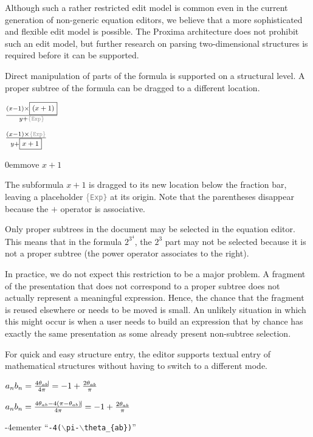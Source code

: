 \documentclass{speauth}
\begin{document}
Although such a rather restricted edit model is common even in the current generation of non-generic equation editors, we believe that a more sophisticated and flexible edit model is possible. The Proxima architecture does not prohibit such an edit model, but further research on parsing two-dimensional structures is required before it can be supported.


Direct manipulation of parts of the formula is supported on a structural level. A proper subtree of the formula can be dragged to a different location.

\editStepScrshot
{$ \frac{(x-1)\times{ \framebox{\scriptsize $(x+1)$}}}{y + \textcolor{gray}{\{\tt Exp\}}}    $}
{\begin{normalsize}$ \frac{(x-1)\times{\textcolor{gray}{\{\tt Exp\}}} }{y + \framebox{\scriptsize $x+1$}}{\vrule height1.8ex width-2.5pt depth1.99ex} $ \end{normalsize}}
{0em}{\small move $x+1$}

The subformula $x+1$ is dragged to its new location below the fraction bar, leaving a placeholder \textcolor{gray}{\{\tt Exp\}} at its origin. Note that the parentheses disappear because the $+$ operator is associative. 

Only proper subtrees in the document may be selected in the equation editor. This means that in the formula $2^{3^4}$, 
the $2^3$ part may not be selected because it is not a proper subtree (the power operator associates to the right). 

In practice, we do not expect this restriction to be a major problem. A fragment of the presentation that does not correspond to a proper subtree does not actually represent a meaningful expression. Hence, the chance that the fragment is reused elsewhere or needs to be moved is small. An unlikely situation in which this might occur is when a user needs to build an expression that by chance has exactly the same presentation as some already present non-subtree selection.


For quick and easy structure entry, the editor supports textual entry of mathematical structures without having to switch to a different mode.


\editStepScrshot
{\begin{normalsize}$a_nb_n = \frac{4\theta_{ab}\vline}{4\pi } = -1 + \frac{2\theta_{ab}}{\pi}$ \end{normalsize}}
{\begin{normalsize}$a_nb_n = \frac{4\theta_{ab} - 4(\pi - \theta_{ab})\vline}{4\pi } = -1 + \frac{2\theta_{ab}}{\pi}$ \end{normalsize}}
{-4em}{\small enter  ``{\tt -4($\backslash$pi-$\backslash$theta\_\{ab\})}'' }
\end{document}
